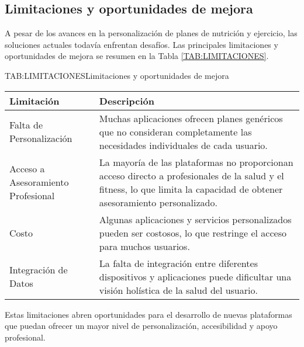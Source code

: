 \subsection{Limitaciones y oportunidades de mejora}

A pesar de los avances en la personalización de planes de nutrición y ejercicio, las soluciones actuales todavía enfrentan desafíos. Las principales limitaciones y oportunidades de mejora se resumen en la Tabla \ref{TAB:LIMITACIONES}.

\begin{table}[Limitaciones y Oportunidades de Mejora]{TAB:LIMITACIONES}{Limitaciones y oportunidades de mejora}
  \begin{tabular}{|p{5cm}|p{8cm}|}
    \hline
    \textbf{Limitación} & \textbf{Descripción} \\
    \hline
    Falta de Personalización & Muchas aplicaciones ofrecen planes genéricos que no consideran completamente las necesidades individuales de cada usuario. \\
    \hline
    Acceso a Asesoramiento Profesional & La mayoría de las plataformas no proporcionan acceso directo a profesionales de la salud y el fitness, lo que limita la capacidad de obtener asesoramiento personalizado. \\
    \hline
    Costo & Algunas aplicaciones y servicios personalizados pueden ser costosos, lo que restringe el acceso para muchos usuarios. \\
    \hline
    Integración de Datos & La falta de integración entre diferentes dispositivos y aplicaciones puede dificultar una visión holística de la salud del usuario. \\
    \hline
  \end{tabular}
\end{table}

Estas limitaciones abren oportunidades para el desarrollo de nuevas plataformas que puedan ofrecer un mayor nivel de personalización, accesibilidad y apoyo profesional.
